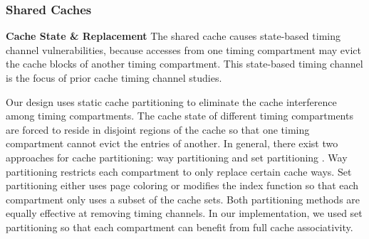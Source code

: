 \subsubsection{Shared Caches}
\mbox{}\newline
\textbf{Cache State \& Replacement}
The shared cache causes state-based timing channel vulnerabilities, because accesses
from one timing compartment may evict the cache blocks of another timing compartment.
This state-based timing channel is the focus of prior cache timing channel 
studies.

Our design uses static cache partitioning to eliminate the cache
interference among timing compartments.
The cache state of different timing compartments are forced to reside in 
disjoint regions of the cache so that one timing compartment cannot evict the 
entries of another.
In general, there exist two approaches for cache partitioning:
way partitioning \cite{dynamic_partitioning} and
set partitioning \cite{rtas_cache_framework}. Way partitioning restricts
each compartment to only replace certain cache ways. Set partitioning
either uses page coloring or modifies the index function so that each compartment
only uses a subset of the cache sets. Both partitioning methods are equally
effective at removing timing channels. In our implementation, we used
set partitioning so that each compartment can benefit from full 
cache associativity.




